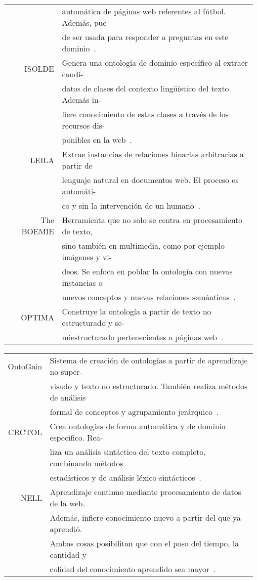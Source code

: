 \begin{table}[H]
\begin{tabular}{rl}
		& automática de páginas web referentes al fútbol. Además, pue- \\
		& de ser usada para responder a preguntas en este dominio~\cite{ref:73}.\\
		ISOLDE & Genera una ontología de dominio específico al extraer candi- \\
		& datos de clases del contexto lingüístico del texto. Además in- \\
		& fiere conocimiento de estas clases a través de los recursos dis- \\
		& ponibles en la web~\cite{ref:74}.\\
		LEILA & Extrae instancias de relaciones binarias arbitrarias a partir de \\
		& lenguaje natural en documentos web. El proceso es automáti- \\
		& co y sin la intervención de un humano~\cite{ref:75}.\\
		The BOEMIE & Herramienta que no solo se centra en procesamiento de texto, \\
		& sino también en multimedia, como por ejemplo imágenes y vi- \\
		& deos. Se enfoca en poblar la ontología con nuevas instancias o \\
		& nuevos conceptos y nuevas relaciones semánticas~\cite{ref:76}.\\
		OPTIMA & Construye la ontología a partir de texto no estructurado y se- \\
		& miestructurado pertenecientes a páginas web~\cite{ref:77}.\\
	\end{tabular}
\end{table}

\begin{table}[H]
	\begin{tabular}{rl}
		OntoGain & Sistema de creación de ontologías a partir de aprendizaje no super- \\
		& visado y texto no estructurado. También realiza métodos de análisis \\
		& formal de conceptos y agrupamiento jerárquico~\cite{ref:78}.\\
		CRCTOL & Crea ontologías de forma automática y de dominio específico. Rea- \\
		& liza un análisis sintáctico del texto completo, combinando métodos \\
		& estadísticos y de análisis léxico-sintácticos~\cite{ref:79}.\\
		NELL & Aprendizaje continuo mediante procesamiento de datos de la web. \\
		& Además, infiere conocimiento nuevo a partir del que ya aprendió. \\
		& Ambas cosas posibilitan que con el paso del tiempo, la cantidad y \\
		& calidad del conocimiento aprendido sea mayor~\cite{ref:80}.
	\end{tabular}
\end{table}

